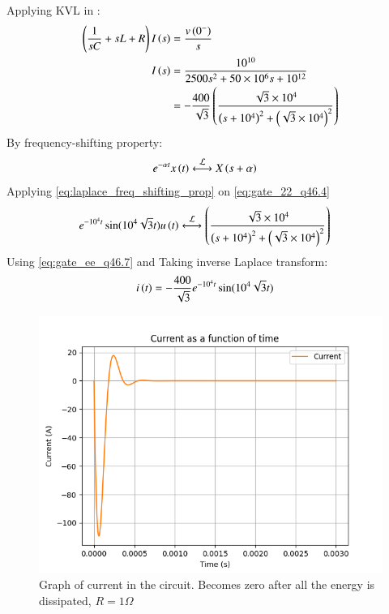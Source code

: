 \documentclass[journal,12pt,twocolumn]{IEEEtran}
\theoremstyle{remark}
\begin{document}
Applying KVL in  :
\begin{align}
    \left(\frac{1}{sC}+sL+R\right)I\left(s\right) &= \frac{v\left(0^-\right)}{s}\\
    I\left(s\right) &= \frac{10^{10}}{2500s^2+50\times10^6s+10^{12}}\\
              &= -\frac{400}{\sqrt{3}}\left(\frac{\sqrt{3}\times10^4}{\left(s+10^4\right)^2+\left(\sqrt{3}\times10^4\right)^2}\right)
\end{align}
By frequency-shifting property:
\begin{align}
    e^{-\alpha t}x\brak{t} &\system{L} X\brak{s+\alpha} \label{eq:laplace_freq_shifting_prop}
\end{align}
Applying \eqref{eq:laplace_freq_shifting_prop} on \eqref{eq:gate_22_q46.4}
\begin{align}
    e^{-10^4t}\sin(10^4\sqrt{3}t)u\brak{t} &\system{L} \brak{\frac{\sqrt{3}\times10^4}{\brak{s+10^4}^2+\brak{\sqrt{3}\times10^4}^2}} \label{eq:gate_ee_q46.7}
\end{align}
Using \eqref{eq:gate_ee_q46.7} and  Taking inverse Laplace transform:
\begin{align}
    i\left(t\right) &= -\frac{400}{\sqrt{3}}e^{-10^4 t}\sin(10^4\sqrt{3}t)
    \end{align}


\begin{figure}[H]
    \includegraphics[width=1\columnwidth]{figs/Current_in_circuit_during_damping.png }
    \caption{Graph of current in the circuit. Becomes zero after all the energy is dissipated, $R=1\Omega$}
    \label{fig:current_in_damping}
\end{figure}
\end{document}
